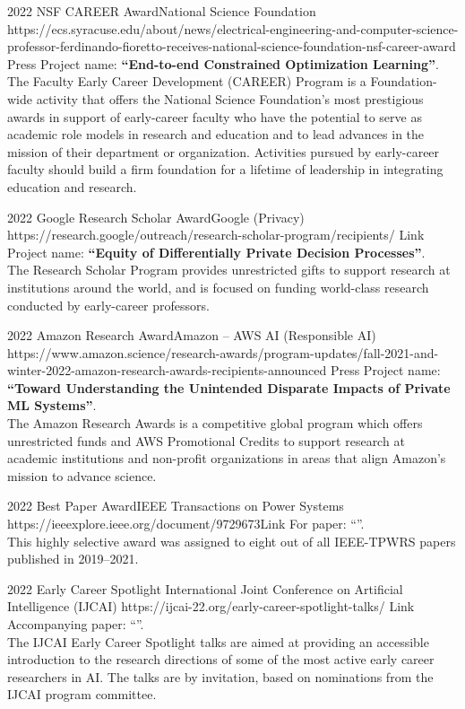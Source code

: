 \documentclass[localFont,alternative]{documentMETADATA}
\begin{document}
\begin{awards}
	\awardentryD
	{2022}
	{NSF CAREER Award}{National Science Foundation}
	{https://ecs.syracuse.edu/about/news/electrical-engineering-and-computer-science-professor-ferdinando-fioretto-receives-national-science-foundation-nsf-career-award}
	{Press}
	{Project name: \textbf{``End-to-end Constrained Optimization Learning''}.\\
	The Faculty Early Career Development (CAREER) Program is a Foundation-wide activity that offers the National
	Science Foundation's most prestigious awards in support of early-career faculty who have the potential to
	serve as academic role models in research and education and to lead advances in the mission of their department or organization.
	Activities pursued by early-career faculty should build a firm foundation for a lifetime of leadership in integrating education and research.
	}

	\awardentryD
	{2022}
	{Google Research Scholar Award}{Google (Privacy)}
	{https://research.google/outreach/research-scholar-program/recipients/}
	{Link}
	{
	Project name: \textbf{``Equity of Differentially Private Decision Processes''}.\\
	The Research Scholar Program provides unrestricted gifts to support research at institutions around the world, and is focused on funding world-class research conducted by early-career professors.
	}

	\awardentryD
	{2022}
	{Amazon Research Award}{Amazon -- AWS AI (Responsible AI)}
	{https://www.amazon.science/research-awards/program-updates/fall-2021-and-winter-2022-amazon-research-awards-recipients-announced}
	{Press}
	{
	Project name: \textbf{``Toward Understanding the Unintended Disparate Impacts of Private ML Systems''}.\\
	The Amazon Research Awards is a competitive global program which offers unrestricted funds and AWS Promotional Credits to support research at academic institutions and non-profit organizations in areas that align Amazon's mission to advance science.}

	\awardentryD
	{2022}
	{Best Paper Award}{IEEE Transactions on Power Systems}
	{https://ieeexplore.ieee.org/document/9729673}{Link}
	{
	For paper: ``''.\\
	This highly selective award was assigned to eight out of all IEEE-TPWRS papers published in 2019--2021.}

	\awardentryD
	{2022}
	{Early Career Spotlight}%
	{International Joint Conference on Artificial Intelligence (IJCAI)}
	{https://ijcai-22.org/early-career-spotlight-talks/}
	{Link}
	{Accompanying paper: ``''.\\
	The IJCAI Early Career Spotlight talks are aimed at providing an accessible introduction to the research directions of some of the most active early career researchers in AI.
	The talks are by invitation, based on nominations from the IJCAI program committee.
	}


\end{awards}
\end{document}
